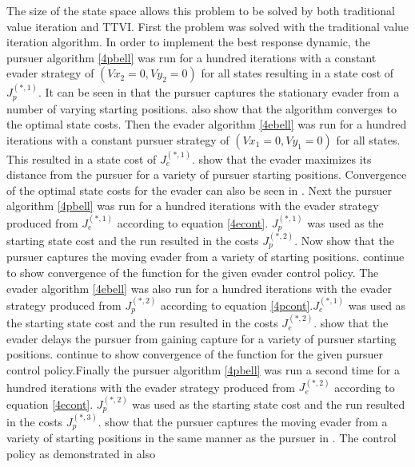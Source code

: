 The size of the state space allows this problem to be solved by both traditional value iteration and TTVI. First the problem was solved with the traditional value iteration algorithm. In order to implement the best response dynamic, the pursuer algorithm \ref{4pbell} was run for a hundred iterations with a constant evader strategy of $(Vx_2 = 0,Vy_2 = 0)$ for all states resulting in a state cost of $J^{(*,1)}_p$. It can be seen in  that the pursuer captures the stationary evader from a number of varying starting positions.  also show that the algorithm converges to the optimal state costs. Then the evader algorithm \ref{4ebell} was run for a hundred iterations with a constant pursuer strategy of $(Vx_1 = 0,Vy_1 = 0)$ for all states. This resulted in a state cost of $J^{(*,1)}_e$.  show that the evader maximizes its distance from the pursuer for a variety of pursuer starting positions. Convergence of the optimal state costs for the evader can also be seen in . Next the pursuer algorithm \ref{4pbell} was run for a hundred iterations with the evader strategy produced from $J^{(*,1)}_e$ according to equation \ref{4econt}. $J^{(*,1)}_p$ was used as the starting state cost and the run resulted in the costs $J^{(*,2)}_p$. Now  show that the pursuer captures the moving evader from a variety of starting positions.  continue to show convergence of the function for the given evader control policy. The evader algorithm \ref{4ebell} was also run for a hundred iterations with the evader strategy produced from $J^{(*,2)}_p$ according to equation \ref{4pcont}.$J^{(*,1)}_e$ was used as the starting state cost and the run resulted in the costs $J^{(*,2)}_e$.  show that the evader delays the pursuer from gaining capture for a variety of pursuer starting positions.  continue to show convergence of the function for the given pursuer control policy.Finally the pursuer algorithm \ref{4pbell} was run a second time for a hundred iterations with the evader strategy produced from $J^{(*,2)}_e$ according to equation \ref{4econt}. $J^{(*,2)}_p$ was used as the starting state cost and the run resulted in the costs $J^{(*,3)}_p$.  show that the pursuer captures the moving evader from a variety of starting positions in the same manner as the pursuer in . The control policy as demonstrated in  also 
